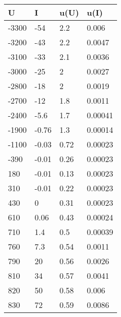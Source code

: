 \begin{table}[H]\centering 
 \begin{tabular}{|l|l|l|l|}
\hline
 \rowcolor[HTML]{EFEFEF} 
   U   &   I   &  u(U)  &  u(I)   \\ \hline

 -3300 &  -54  &  2.2   &  0.006  \\ \hline
 -3200 &  -43  &  2.2   & 0.0047  \\ \hline
 -3100 &  -33  &  2.1   & 0.0036  \\ \hline
 -3000 &  -25  &   2    & 0.0027  \\ \hline
 -2800 &  -18  &   2    & 0.0019  \\ \hline
 -2700 &  -12  &  1.8   & 0.0011  \\ \hline
 -2400 & -5.6  &  1.7   & 0.00041 \\ \hline
 -1900 & -0.76 &  1.3   & 0.00014 \\ \hline
 -1100 & -0.03 &  0.72  & 0.00023 \\ \hline
 -390  & -0.01 &  0.26  & 0.00023 \\ \hline
  180  & -0.01 &  0.13  & 0.00023 \\ \hline
  310  & -0.01 &  0.22  & 0.00023 \\ \hline
  430  &   0   &  0.31  & 0.00023 \\ \hline
  610  & 0.06  &  0.43  & 0.00024 \\ \hline
  710  &  1.4  &  0.5   & 0.00039 \\ \hline
  760  &  7.3  &  0.54  & 0.0011  \\ \hline
  790  &  20   &  0.56  & 0.0026  \\ \hline
  810  &  34   &  0.57  & 0.0041  \\ \hline
  820  &  50   &  0.58  &  0.006  \\ \hline
  830  &  72   &  0.59  & 0.0086  \\ \hline

\end{tabular}
\end{table}